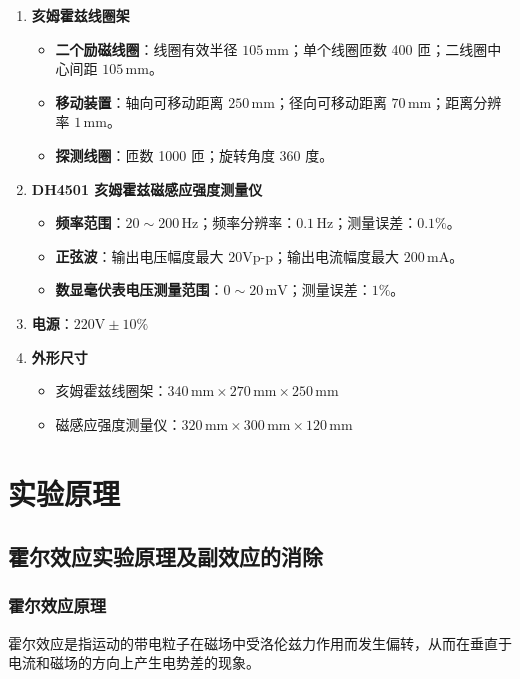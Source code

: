 \documentclass[11pt]{article}
\begin{document}
\begin{enumerate}
    \item \textbf{亥姆霍兹线圈架}
    \begin{itemize}
        \item \textbf{二个励磁线圈}：线圈有效半径 $105\,\text{mm}$；单个线圈匝数 400 匝；二线圈中心间距 $105\,\text{mm}$。
        \item \textbf{移动装置}：轴向可移动距离 $250\,\text{mm}$；径向可移动距离 $70\,\text{mm}$；距离分辨率 $1\,\text{mm}$。
        \item \textbf{探测线圈}：匝数 1000 匝；旋转角度 360 度。
    \end{itemize}

    \item \textbf{DH4501 亥姆霍兹磁感应强度测量仪}
    \begin{itemize}
        \item \textbf{频率范围}：$20 \sim 200\,\text{Hz}$；频率分辨率：$0.1\,\text{Hz}$；测量误差：$0.1\%$。
        \item \textbf{正弦波}：输出电压幅度最大 $20\text{Vp-p}$；输出电流幅度最大 $200\,\text{mA}$。
        \item \textbf{数显毫伏表电压测量范围}：$0 \sim 20\,\text{mV}$；测量误差：$1\%$。
    \end{itemize}

    \item \textbf{电源}：$220\text{V} \pm 10\%$

    \item \textbf{外形尺寸}
    \begin{itemize}
        \item 亥姆霍兹线圈架：$340\,\text{mm} \times 270\,\text{mm} \times 250\,\text{mm}$
        \item 磁感应强度测量仪：$320\,\text{mm} \times 300\,\text{mm} \times 120\,\text{mm}$
    \end{itemize}
\end{enumerate}

\section{实验原理}
\subsection{霍尔效应实验原理及副效应的消除}

\subsubsection{霍尔效应原理}
霍尔效应是指运动的带电粒子在磁场中受洛伦兹力作用而发生偏转，从而在垂直于电流和磁场的方向上产生电势差的现象。
\end{document}
